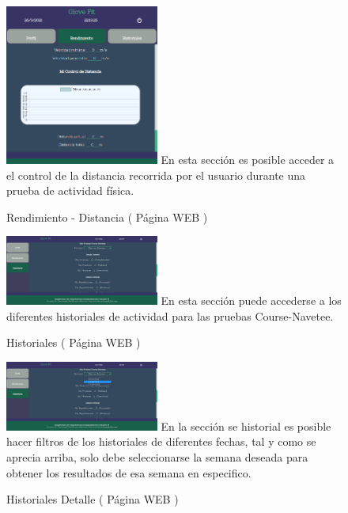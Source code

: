 \documentclass[osajnl,twocolumn,showpacs,superscriptaddress,10pt]{revtex4-1}
\begin{document}
\begin{figure} [H] \centering 
\caption{Rendimiento - Distancia
 ( Página WEB )}
\includegraphics[width=0.45\textwidth]{02rendimiento3.png}
\newline En esta sección es posible acceder a el control de la distancia recorrida por el usuario durante una prueba de actividad física.
\end{figure}

\begin{figure} [H] \centering 
\caption{Historiales
 ( Página WEB )}
\includegraphics[width=0.45\textwidth]{03hitory-pruebas.png}
\newline En esta sección puede accederse a los diferentes historiales de actividad para las pruebas Course-Navetee.
\end{figure}

\begin{figure} [H] \centering 
\caption{Historiales Detalle
 ( Página WEB )}
\includegraphics[width=0.45\textwidth]{04history-fecha.png}
\newline En la sección se historial es posible hacer filtros de los historiales de diferentes fechas, tal y como se aprecia arriba, solo debe seleccionarse la semana deseada para obtener los resultados de esa semana en especifico.
\end{figure}
\end{document}
